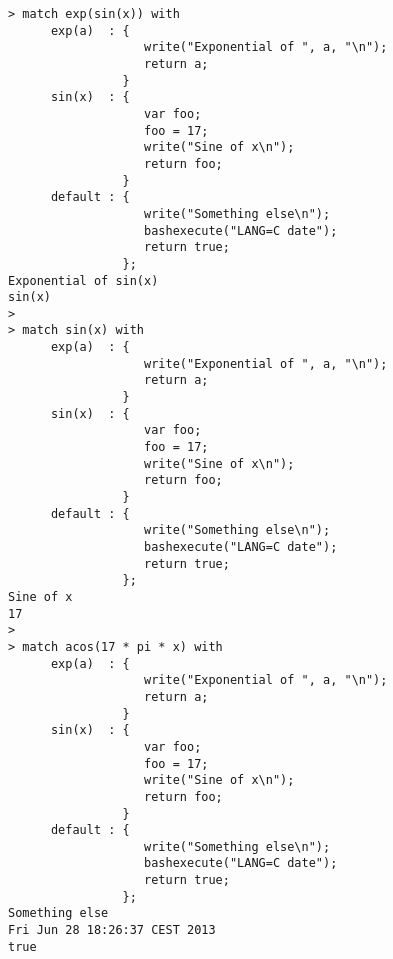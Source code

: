 \begin{center}\begin{minipage}{15cm}\begin{Verbatim}[frame=single]
> match exp(sin(x)) with
      exp(a)  : { 
                   write("Exponential of ", a, "\n");
                   return a;
                }
      sin(x)  : {
                   var foo;
                   foo = 17;
                   write("Sine of x\n");
                   return foo;
                }
      default : {
                   write("Something else\n");
                   bashexecute("LANG=C date");
                   return true;
                };
Exponential of sin(x)
sin(x)
> 
> match sin(x) with
      exp(a)  : { 
                   write("Exponential of ", a, "\n");
                   return a;
                }
      sin(x)  : {
                   var foo;
                   foo = 17;
                   write("Sine of x\n");
                   return foo;
                }
      default : {
                   write("Something else\n");
                   bashexecute("LANG=C date");
                   return true;
                };
Sine of x
17
> 
> match acos(17 * pi * x) with
      exp(a)  : { 
                   write("Exponential of ", a, "\n");
                   return a;
                }
      sin(x)  : {
                   var foo;
                   foo = 17;
                   write("Sine of x\n");
                   return foo;
                }
      default : {
                   write("Something else\n");
                   bashexecute("LANG=C date");
                   return true;
                };
Something else
Fri Jun 28 18:26:37 CEST 2013
true
\end{Verbatim}
\end{minipage}\end{center}

